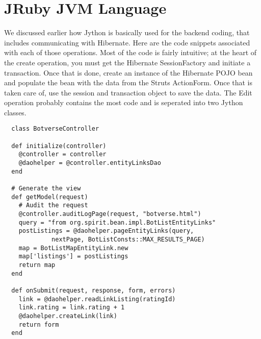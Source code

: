 \section{JRuby JVM Language}

We discussed earlier how Jython is basically used for the backend 
coding, that includes communicating with Hibernate. 
Here are the code snippets associated with each of those operations. 
Most of the code is fairly intuitive; at the heart of the 
create operation, you must get the Hibernate SessionFactory 
and initiate a transaction. Once that is done, 
create an instance of the Hibernate POJO bean and populate 
the bean with the data from the Struts ActionForm. 
Once that is taken care of, use the session and transaction 
object to save the data. The Edit operation probably contains 
the most code and is seperated into two Jython classes.

\begin{verbatim}
  class BotverseController
		
  def initialize(controller)
    @controller = controller
    @daohelper = @controller.entityLinksDao
  end

  # Generate the view
  def getModel(request)  
    # Audit the request
    @controller.auditLogPage(request, "botverse.html")
	query = "from org.spirit.bean.impl.BotListEntityLinks"
	postListings = @daohelper.pageEntityLinks(query, 
	         nextPage, BotListConsts::MAX_RESULTS_PAGE)
	map = BotListMapEntityLink.new    
    map['listings'] = postListings
    return map
  end

  def onSubmit(request, response, form, errors)
    link = @daohelper.readLinkListing(ratingId)    
    link.rating = link.rating + 1
    @daohelper.createLink(link)
    return form
  end

\end{verbatim}
